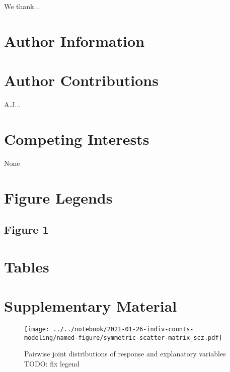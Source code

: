 \documentclass[letterpaper]{article}
\begin{document}
We thank...

\section*{Author Information}

\section*{Author Contributions}

A.J...

\section*{Competing Interests}

None

\section*{Figure Legends}

\subsection*{Figure 1}

\section*{Tables}

\section*{Supplementary Material}

\setcounter{table}{0}
\makeatletter 
\renewcommand{\figurename}{Supplementary Table} %
\makeatother

\setcounter{figure}{0}
\makeatletter 
\renewcommand{\figurename}{Supplementary Figure} %
\makeatother

\begin{figure}[p]
\begin{center}
\texttt{[image: ../../notebook/2021-01-26-indiv-counts-modeling/named-figure/symmetric-scatter-matrix\_scz.pdf]}
\end{center}
\caption{
Pairwise joint distributions of response and explanatory variables TODO: fix legend
}
\label{fig:scattermatrix}
\end{figure}
\end{document}
